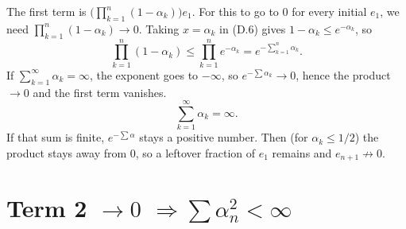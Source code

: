 The first term is $\bigl(\prod_{k=1}^{n}(1-\alpha_k)\bigr)e_1$. For this to go to $0$ for every initial $e_1$, we need $\prod_{k=1}^{n}(1-\alpha_k)\to 0$. Taking $x=\alpha_k$ in (D.6) gives $1-\alpha_k\le e^{-\alpha_k}$, so
\[
\prod_{k=1}^{n}(1-\alpha_k)
\le
\prod_{k=1}^{n}e^{-\alpha_k}
=
e^{-\sum_{k=1}^{n}\alpha_k}.
\]
If $\sum_{k=1}^{\infty}\alpha_k=\infty$, the exponent goes to $-\infty$, so $e^{-\sum\alpha_k}\to 0$, hence the product $\to 0$ and the first term vanishes.
\begin{equation}
\sum_{k=1}^{\infty}\alpha_k=\infty.
\tag{D.7}
\end{equation}
If that sum is finite, $e^{-\sum\alpha}$ stays a positive number. Then (for $\alpha_k\le 1/2$) the product stays away from $0$, so a leftover fraction of $e_1$ remains and $e_{n+1}\not\to 0$.

\section{Term 2 $\to 0$ $\Rightarrow\sum\alpha_n^2<\infty$}

